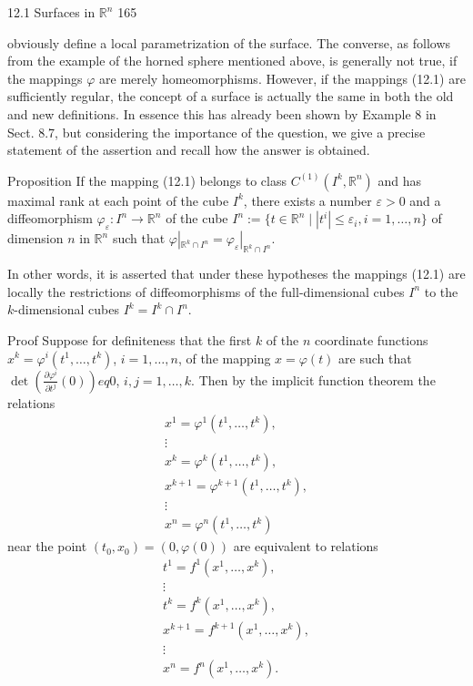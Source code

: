 12.1 Surfaces in $\mathbb{R}^n$ 165

obviously define a local parametrization of the surface. The converse, as follows
from the example of the horned sphere mentioned above, is generally not true, if
the mappings $\varphi$ are merely homeomorphisms. However, if the mappings (12.1) are
sufficiently regular, the concept of a surface is actually the same in both the old and
new definitions.
In essence this has already been shown by Example 8 in Sect. 8.7, but considering
the importance of the question, we give a precise statement of the assertion and
recall how the answer is obtained.

Proposition If the mapping (12.1) belongs to class $C^{(1)}(I^k, \mathbb{R}^n)$ and has maximal
rank at each point of the cube $I^k$, there exists a number $\varepsilon > 0$ and a diffeomorphism
$\varphi_{\varepsilon}: I^n \rightarrow \mathbb{R}^n$ of the cube $I^n := \{t \in \mathbb{R}^n \mid |t^i| \leq \varepsilon_i, i=1, \ldots, n\}$ of dimension $n$
in $\mathbb{R}^n$ such that $\varphi|_{\mathbb{R}^k \cap I^n} = \varphi_{\varepsilon}|_{\mathbb{R}^k \cap I^n}$.

In other words, it is asserted that under these hypotheses the mappings (12.1) are
locally the restrictions of diffeomorphisms of the full-dimensional cubes $I^n$ to the
$k$-dimensional cubes $I^k = I^k \cap I^n$.

Proof Suppose for definiteness that the first $k$ of the $n$ coordinate functions $x^k =
\varphi^i (t^1, \ldots, t^k)$, $i=1, \ldots, n$, of the mapping $x = \varphi(t)$ are such that $\det \left( \frac{\partial \varphi^i}{\partial t^j} (0) \right) 
eq 0$,
$i, j = 1, \ldots, k$. Then by the implicit function theorem the relations
$$
\begin{array}{l}
x^1 = \varphi^1 (t^1, \ldots, t^k), \\
\vdots \\
x^k = \varphi^k (t^1, \ldots, t^k), \\
x^{k+1} = \varphi^{k+1} (t^1, \ldots, t^k), \\
\vdots \\
x^n = \varphi^n (t^1, \ldots, t^k)
\end{array}
$$
near the point $(t_0, x_0) = (0, \varphi(0))$ are equivalent to relations
$$
\begin{array}{l}
t^1 = f^1(x^1,\ldots,x^k), \\
\vdots \\
t^k = f^k(x^1,\ldots,x^k), \\
x^{k+1} = f^{k+1}(x^1,\ldots,x^k), \\
\vdots \\
x^n = f^n(x^1,\ldots,x^k).
\end{array}
$$